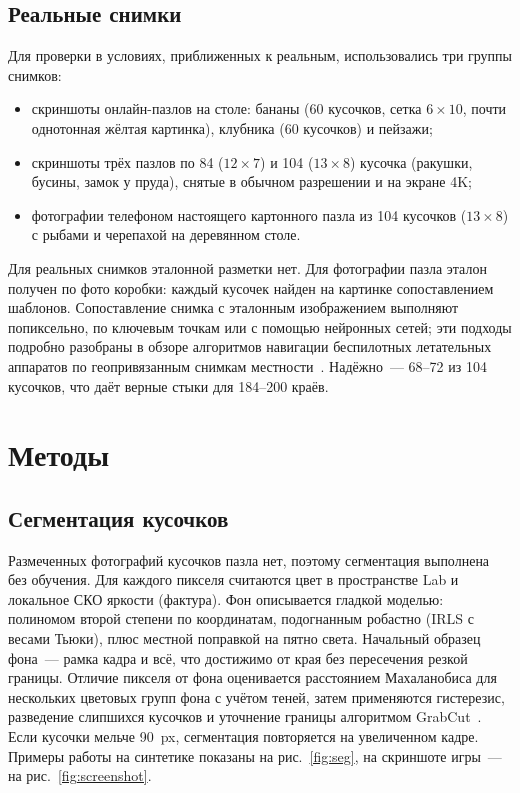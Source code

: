 \documentclass{misisarticle}
\begin{document}
\subsection{Реальные снимки}

Для проверки в условиях, приближенных к реальным, использовались три группы снимков:
\begin{itemize}
  \item скриншоты онлайн-пазлов на столе: бананы (60 кусочков, сетка $6\times10$, почти однотонная жёлтая картинка), клубника (60 кусочков) и пейзажи;
  \item скриншоты трёх пазлов по 84 ($12\times7$) и 104 ($13\times8$) кусочка (ракушки, бусины, замок у пруда), снятые в обычном разрешении и на экране 4K;
  \item фотографии телефоном настоящего картонного пазла из 104 кусочков ($13\times8$) с рыбами и черепахой на деревянном столе.
\end{itemize}

Для реальных снимков эталонной разметки нет. Для фотографии пазла эталон получен по фото коробки: каждый кусочек найден на картинке сопоставлением шаблонов. Сопоставление снимка с эталонным изображением выполняют попиксельно, по ключевым точкам или с помощью нейронных сетей; эти подходы подробно разобраны в обзоре алгоритмов навигации беспилотных летательных аппаратов по геопривязанным снимкам местности~\cite{ali2022}. Надёжно~--- 68--72 из 104 кусочков, что даёт верные стыки для 184--200 краёв.

\section{Методы}

\subsection{Сегментация кусочков}

Размеченных фотографий кусочков пазла нет, поэтому сегментация выполнена без обучения. Для каждого пикселя считаются цвет в пространстве Lab и локальное СКО яркости (фактура). Фон описывается гладкой моделью: полиномом второй степени по координатам, подогнанным робастно (IRLS с весами Тьюки), плюс местной поправкой на пятно света. Начальный образец фона~--- рамка кадра и всё, что достижимо от края без пересечения резкой границы. Отличие пикселя от фона оценивается расстоянием Махаланобиса для нескольких цветовых групп фона с учётом теней, затем применяются гистерезис, разведение слипшихся кусочков и уточнение границы алгоритмом GrabCut~\cite{rother2004}. Если кусочки мельче 90~px, сегментация повторяется на увеличенном кадре. Примеры работы на синтетике показаны на рис.~\ref{fig:seg}, на скриншоте игры~--- на рис.~\ref{fig:screenshot}.
\end{document}
